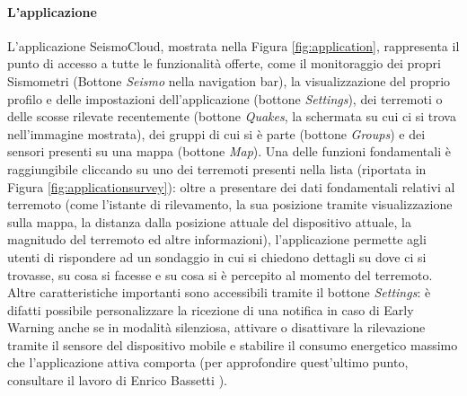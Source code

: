 \paragraph{L'applicazione}

L'applicazione SeismoCloud, mostrata nella Figura \ref{fig:application}, rappresenta il punto di accesso a tutte le funzionalità offerte, come il monitoraggio dei propri Sismometri (Bottone \textit{Seismo} nella navigation bar), la visualizzazione del proprio profilo e delle impostazioni dell'applicazione (bottone \textit{Settings}), dei terremoti o delle scosse rilevate recentemente (bottone \textit{Quakes}, la schermata su cui ci si trova nell'immagine mostrata), dei gruppi di cui si è parte (bottone \textit{Groups}) e dei sensori presenti su una mappa (bottone \textit{Map}). 
Una delle funzioni fondamentali è raggiungibile cliccando su uno dei terremoti presenti nella lista (riportata in Figura \ref{fig:applicationsurvey}): oltre a presentare dei dati fondamentali relativi al terremoto (come l'istante di rilevamento, la sua posizione tramite visualizzazione sulla mappa, la distanza dalla posizione attuale del dispositivo attuale, la magnitudo del terremoto ed altre informazioni), l'applicazione permette agli utenti di rispondere ad un sondaggio in cui si chiedono dettagli su dove ci si trovasse, su cosa si facesse e su cosa si è percepito al momento del terremoto. Altre caratteristiche importanti sono accessibili tramite il bottone \textit{Settings}: è difatti possibile personalizzare la ricezione di una notifica in caso di Early Warning anche se in modalità silenziosa, attivare o disattivare la rilevazione tramite il sensore del dispositivo mobile e stabilire il consumo energetico massimo che l'applicazione attiva comporta (per approfondire quest'ultimo punto, consultare il lavoro di Enrico Bassetti \cite{enricobassetti}).

